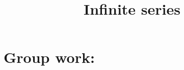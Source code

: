 \documentclass[]{ximera}
\title{Infinite series}
\begin{document}
\begin{abstract}		\end{abstract}
\maketitle



\begin{comment}
\section{Warm up:}

	\begin{freeResponse}
	
	\end{freeResponse}
	
\begin{instructorNotes}

\end{instructorNotes}
\end{comment}







\section{Group work:}
\end{document}
